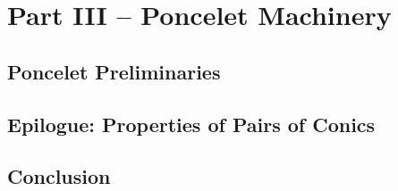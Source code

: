 \documentclass{book}
\begin{document}
\part{Part III -- Poncelet Machinery}

\chapter{Poncelet Preliminaries}
\label{chap:02-poncelet-prelims}

\chapter{Epilogue: Properties of Pairs of Conics}
\label{chap:09-conics}
% 

\chapter{Conclusion}
\label{chap:10-conclusion}
%

\appendix
%

%




\end{document}
